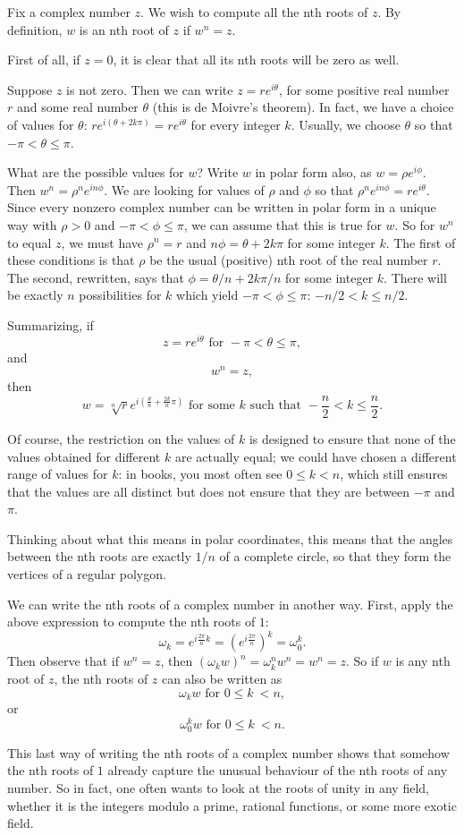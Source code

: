 \documentclass[12pt]{article}
\begin{document}

Fix a complex number $z$.  We wish to compute all the nth roots of $z$.  By definition, $w$ is an nth root of $z$ if $w^n=z$.  

First of all, if $z=0$, it is clear that all its nth roots will be zero as well. 

Suppose $z$ is not zero.  Then we can write $z=re^{i\theta}$, for some positive real number $r$ and some real number $\theta$ (this is de Moivre's theorem).  In fact, we have a choice of values for $\theta$: $re^{i(\theta + 2k\pi)}=re^{i\theta}$ for every integer $k$.  Usually, we choose $\theta$ so that $-\pi<\theta\leq\pi$. 

What are the possible values for $w$?  Write $w$ in polar form also, as $w=\rho e^{i\phi}$.  Then $w^n=\rho^n e^{in\phi}$.  We are looking for values of $\rho$ and $\phi$ so that $\rho^n e^{in\phi} = re^{i\theta}$.  Since every nonzero complex number can be written in polar form in a unique way with $\rho>0$ and $-\pi<\phi\leq\pi$, we can assume that this is true for $w$.  So for $w^n$ to equal $z$, we must have $\rho^n = r$ and $n\phi = \theta + 2k\pi$ for some integer $k$.  The first of these conditions is that $\rho$ be the usual (positive) nth root of the real number $r$.  The second, rewritten, says that $\phi = \theta/n + 2k\pi/n$ for some integer $k$.  There will be exactly $n$ possibilities for $k$ which yield $-\pi<\phi\leq\pi$: $-n/2<k\leq n/2$. 

Summarizing, if 
\[
z = re^{i\theta}\text{ for }-\pi<\theta\leq\pi,
\]
and 
\[
w^n = z,
\]
then 
\[
w = \sqrt[n]{r}e^{i\left(\frac{\theta}{n} + \frac{2k}{n}\pi\right)}\text{ for some $k$ such that }-\frac{n}{2}<k\leq \frac{n}{2}.
\]

Of course, the restriction on the values of $k$ is designed to ensure that none of the values obtained for different $k$ are actually equal; we could have chosen a different range of values for $k$: in books, you most often see $0\leq k < n$, which still ensures that the values are all distinct but does not ensure that they are between $-\pi$ and $\pi$. 

Thinking about what this means in polar coordinates, this means that the angles between the nth roots are exactly $1/n$ of a complete circle, so that they form the vertices of a regular polygon.

We can write the nth roots of a complex number in another way.  First, apply the above expression to compute the nth roots of $1$:
\[
\omega_k = e^{i\frac{2\pi}{n}k} = \left(e^{i\frac{2\pi}{n}}\right)^k = \omega_0^k.
\]
Then observe that if $w^n=z$, then $(\omega_kw)^n=\omega_k^nw^n=w^n=z$.  So if $w$ is any nth root of $z$, the nth roots of $z$ can also be written as
\[
\omega_kw\text{ for }0\leq k\ < n,
\]
or
\[
\omega_0^k w\text{ for }0\leq k\ < n.
\]

This last way of writing the nth roots of a complex number shows that somehow the nth roots of $1$ already capture the unusual behaviour of the nth roots of any number.  So in fact, one often wants to look at the roots of unity in any field, whether it is the integers modulo a prime, rational functions, or some more exotic field.
\end{document}
